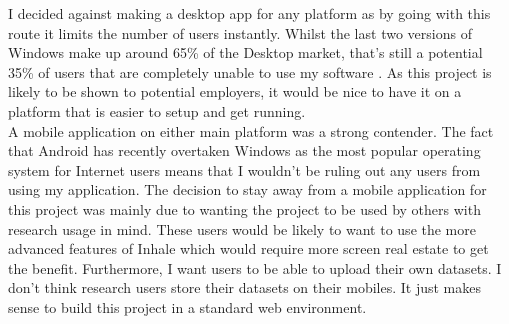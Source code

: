 I decided against making a desktop app for any platform as by going with this route it limits the number of users instantly. Whilst the last two versions of Windows make up around 65\% of the Desktop market, that's still a potential 35\% of users that are completely unable to use my software \cite{windows}. As this project is likely to be shown to potential employers, it would be nice to have it on a platform that is easier to setup and get running.\\

A mobile application on either main platform was a strong contender. The fact that Android has recently overtaken Windows as the most popular operating system for Internet users \cite{android} means that I wouldn't be ruling out any users from using my application. The decision to stay away from a mobile application for this project was mainly due to wanting the project to be used by others with research usage in mind. These users would be likely to want to use the more advanced features of Inhale which would require more screen real estate to get the benefit. Furthermore, I want users to be able to upload their own datasets. I don't think research users store their datasets on their mobiles. It just makes sense to build this project in a standard web environment.\\
